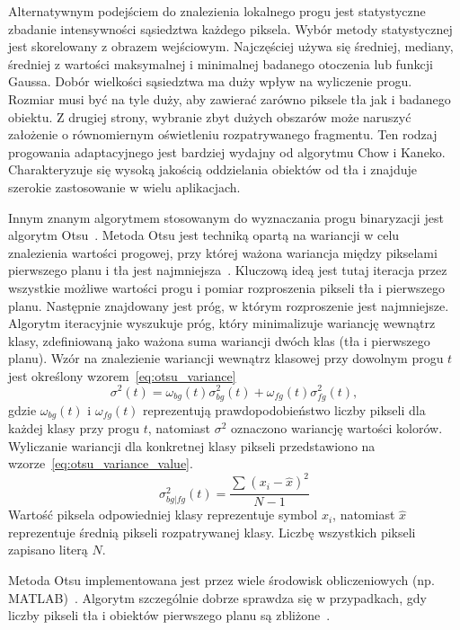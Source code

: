 Alternatywnym podejściem do znalezienia lokalnego progu jest statystyczne zbadanie intensywności sąsiedztwa każdego piksela.
Wybór metody statystycznej jest skorelowany z obrazem wejściowym.
Najczęściej używa się średniej, mediany, średniej z wartości maksymalnej i minimalnej badanego otoczenia lub funkcji Gaussa.
Dobór wielkości sąsiedztwa ma duży wpływ na wyliczenie progu.
Rozmiar musi być na tyle duży, aby zawierać zarówno piksele tła jak i badanego obiektu.
Z drugiej strony, wybranie zbyt dużych obszarów może naruszyć założenie o równomiernym oświetleniu rozpatrywanego fragmentu.
Ten rodzaj progowania adaptacyjnego jest bardziej wydajny od algorytmu Chow i Kaneko.
Charakteryzuje się wysoką jakością oddzielania obiektów od tła i znajduje szerokie zastosowanie w wielu aplikacjach.

Innym znanym algorytmem stosowanym do wyznaczania progu binaryzacji jest algorytm Otsu~\cite{4310076}.
Metoda Otsu jest techniką opartą na wariancji w celu znalezienia wartości progowej, przy której ważona wariancja między pikselami pierwszego planu i tła jest najmniejsza~\cite{otsu_article}.
Kluczową ideą jest tutaj iteracja przez wszystkie możliwe wartości progu i pomiar rozproszenia pikseli tła i pierwszego planu.
Następnie znajdowany jest próg, w którym rozproszenie jest najmniejsze.
Algorytm iteracyjnie wyszukuje próg, który minimalizuje wariancję wewnątrz klasy, zdefiniowaną jako ważona suma wariancji dwóch klas (tła i pierwszego planu).
Wzór na znalezienie wariancji wewnątrz klasowej przy dowolnym progu $t$ jest określony wzorem~\eqref{eq:otsu_variance}
\begin{equation}
    \label{eq:otsu_variance}
    \sigma^2(t)=\omega_{bg}(t)\sigma_{bg}^2(t)+\omega_{fg}(t)\sigma_{fg}^2(t),
\end{equation}
gdzie $\omega_{bg}(t)$ i $\omega_{fg}(t)$ reprezentują prawdopodobieństwo liczby pikseli dla każdej klasy przy progu $t$, natomiast $\sigma^2$ oznaczono wariancję wartości kolorów.
Wyliczanie wariancji dla konkretnej klasy pikseli przedstawiono na wzorze~\eqref{eq:otsu_variance_value}.
\begin{equation}
    \label{eq:otsu_variance_value}
    \sigma_{bg | fg}^2(t)=\dfrac{\sum_{}^{}(x_i-\hat{x})^2}{N-1}
\end{equation}
Wartość piksela odpowiedniej klasy reprezentuje symbol $x_i$, natomiast $\hat{x}$ reprezentuje średnią pikseli rozpatrywanej klasy.
Liczbę wszystkich pikseli zapisano literą $N$.

Metoda Otsu implementowana jest przez wiele środowisk obliczeniowych (np. MATLAB)~\cite{otsu_inzynieria_rolnicza}.
Algorytm szczególnie dobrze sprawdza się w przypadkach, gdy liczby pikseli tła i obiektów pierwszego planu są zbliżone~\cite{10.1117/1.1631315}.

